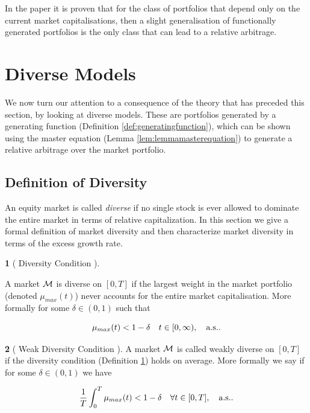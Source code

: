 \documentclass[british]{amsart} \usepackage{lmodern}
\numberwithin{equation}{section} \numberwithin{figure}{section}
\theoremstyle{plain} \newtheorem{thm}{\protect\theoremname}[section]
\theoremstyle{definition} \newtheorem{defn}[thm]{\protect\definitionname}
\theoremstyle{plain} \newtheorem{assumption}[thm]{\protect\assumptionname}
\theoremstyle{plain} \newtheorem{lem}[thm]{\protect\lemmaname}
\theoremstyle{plain} \newtheorem{prop}[thm]{\protect\propositionname}
\theoremstyle{remark} \newtheorem{rem}[thm]{\protect\remarkname}
\theoremstyle{plain} \newtheorem{cor}[thm]{\protect\corollaryname}
\begin{document}
In the paper \cite{pal2016geometry} it is proven that for the class of
portfolios that depend only on the current market capitalisations, then a slight
generalisation of functionally generated portfolios is the only class that can
lead to a relative arbitrage.

\newpage
\section{Diverse Models}

We now turn our attention to a consequence of the theory that has preceded this
section, by looking at diverse models. These are portfolios generated by a
generating function (Definition \ref{def:generatingfunction}), which can be
shown using the master equation (Lemma \ref{lem:lemmamasterequation}) to
generate a relative arbitrage over the market portfolio.

\subsection{Definition of Diversity}

An equity market is called \textit{diverse} if no single stock is ever allowed
to dominate the entire market in terms of relative capitalization. In this
section we give a formal definition of market diversity and then characterize
market diversity in terms of the excess growth rate.

\begin{defn} 
  [
    {\cite[Definition 3.2]{fernholz1999diversity}}
    Diversity Condition
  ]
  \label{def:defnD}

  A market $\mathcal{M}$ is diverse on $[0,T]$ if the largest weight in the market
  portfolio (denoted $\mu_{max}(t)$) never accounts for the entire market
  capitalisation. More formally for some $\delta\in(0,1)$ such that

  \begin{equation}
    \label{eq:eqD}
      \mu_{max}(t) < 1 - \delta
    \quad t\in[0,\infty),
    \quad \text{a.s.}.
  \end{equation}

\end{defn}

\begin{defn}
  [
    {\cite[Equation 5.2]{fernholz2009}}
    Weak Diversity Condition
  ]
  A market $\mathcal{M}$ is called weakly diverse on $[0,T]$ if the diversity
  condition (Definition \ref{def:defnD}) holds on average. More formally 
  we say if for some $\delta\in(0,1)$ we have

  \begin{equation}
    \label{eq:eqWD}
      \frac{1}{T}\int_{0}^{T}\mu_{max}(t) < 1 - \delta
      \quad \forall t\in[0,T],
      \quad \text{a.s.}.
  \end{equation}
\end{defn}
\end{document}
